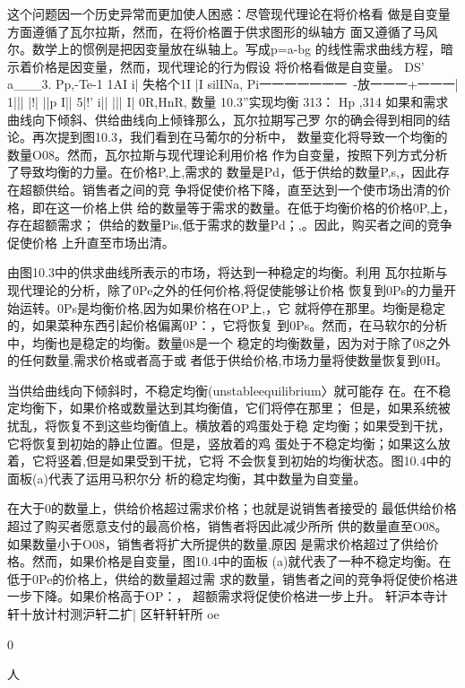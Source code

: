 这个问题因一个历史异常而更加使人困惑：尽管现代理论在将价格看
做是自变量方面遵循了瓦尔拉斯，然而，在将价格置于供求图形的纵轴方
面又遵循了马风尔。数学上的惯例是把因变量放在纵轴上。写成p=a-bg
的线性需求曲线方程，暗示着价格是因变量，然而，现代理论的行为假设
将价格看做是自变量。
DS’
a___3.
Pp,-Te-1
1AI
i|
失格个1I
|I
silINa,
Pi一一一一一一一~-放一一一+一一一|
1|||
|!|
||p
I||
5|!'
i||
|||
I|
0R,HnR,
数量
10.3”实现均衡
313：
Hp
,314
如果和需求曲线向下倾斜、供给曲线向上倾锋那么，瓦尔拉期写己罗
尔的确会得到相同的结论。再次提到图10.3，我们看到在马葡尔的分析中，
数量变化将导致一个均衡的数量O08。然而，瓦尔拉斯与现代理论利用价格
作为自变量，按照下列方式分析了导致均衡的力量。在价格P,上,需求的
数量是Pd，低于供给的数量P,s,，因此存在超额供给。销售者之间的竞
争将促使价格下降，直至达到一个使市场出清的价格，即在这一价格上供
给的数量等于需求的数量。在低于均衡价格的价格0P,上，存在超额需求；
供给的数量Pis,低于需求的数量Pd；,。因此，购买者之间的竞争促使价格
上升直至市场出清。

由图10.3中的供求曲线所表示的市场，将达到一种稳定的均衡。利用
瓦尔拉斯与现代理论的分析，除了0Pe之外的任何价格,将促使能够让价格
恢复到0Ps的力量开始运转。0Ps是均衡价格,因为如果价格在OP上,，它
就将停在那里。均衡是稳定的，如果菜种东西引起价格偏离0P：，它将恢复
到0Ps。然而，在马软尔的分析中，均衡也是稳定的均衡。数量08是一个
稳定的均衡数量，因为对于除了08之外的任何数量,需求价格或者高于或
者低于供给价格,市场力量将使数量恢复到0H。

当供给曲线向下倾斜时，不稳定均衡(unstableequilibrium〉就可能存
在。在不稳定均衡下，如果价格或数量达到其均衡值，它们将停在那里；
但是，如果系统被扰乱，将恢复不到这些均衡值上。横放着的鸡蛋处于稳
定均衡；如果受到干扰，它将恢复到初始的静止位置。但是，竖放着的鸡
蛋处于不稳定均衡；如果这么放着，它将竖着,但是如果受到干扰，它将
不会恢复到初始的均衡状态。图10.4中的面板(a)代表了运用马积尔分
析的稳定均衡，其中数量为自变量。

在大于0的数量上，供给价格超过需求价格；也就是说销售者接受的
最低供给价格超过了购买者愿意支付的最高价格，销售者将因此减少所所
供的数量直至O08。如果数量小于O08，销售者将扩大所提供的数量,原因
是需求价格超过了供给价格。然而，如果价格是自变量，图10.4中的面板
(a)就代表了一种不稳定均衡。在低于0Pe的价格上，供给的数量超过需
求的数量，销售者之间的竞争将促使价格进一步下降。如果价格高于OP：，
超额需求将促使价格进一步上升。
轩沪本寺计轩十放计村测沪轩二扩|
区轩轩轩所
oe

0

人

